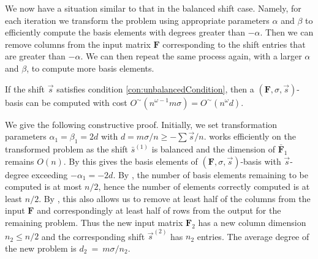 We now have a situation similar to that in the balanced shift case.
Namely, for each iteration we transform the problem using appropriate
parameters $\alpha$ and $\beta$ to efficiently compute the basis
elements with degrees greater than $-\alpha$. Then we can remove
columns from the input matrix $\mathbf{F}$ corresponding to the shift
entries that are greater than $-\alpha$. We can then repeat the same
process again, with a larger $\alpha$ and $\beta$, to compute more
basis elements. 
\begin{thm}
If the shift $\vec{s}$ satisfies condition \eqref{con:unbalancedCondition},
then a $\left(\mathbf{F},\sigma,\vec{s}\right)$-basis can be computed
with cost $O^{\sim}\left(n^{\omega-1}m\sigma\right)=O^{\sim}\left(n^{\omega}d\right)$. \end{thm}
\begin{pf}
We give the following constructive proof. Initially, we set transformation
parameters $\alpha_{1}=\beta_{1}=2d$ with $d=m\sigma/n\ge-\sum\vec{s}/n$.
 works efficiently on the transformed problem
as the shift $\bar{s}^{\left(1\right)}$ is balanced and the dimension
of $\bar{\mathbf{F}}_{1}$ remains $O\left(n\right)$. By 
this gives the basis elements of $\left(\mathbf{F},\sigma,\vec{s}\right)$-basis
with $\vec{s}$-degree exceeding $-\alpha_{1}=-2d$. By ,
the number of basis elements remaining to be computed is at most $n/2$,
hence the number of elements correctly computed is at least $n/2$.
By , this also allows us to remove
at least half of the columns from the input $\mathbf{F}$ and correspondingly
at least half of rows from the output for the remaining problem. Thus
the new input matrix $\mathbf{F}_{2}$ has a new column dimension
$n_{2}\le n/2$ and the corresponding shift $\vec{s}^{\left(2\right)}$
has $n_{2}$ entries. The average degree of the new problem is $d_{2}~=~m\sigma/n_{2}$.


\end{pf}
